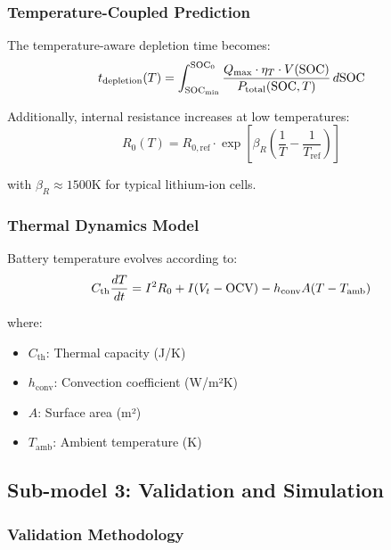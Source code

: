 \subsubsection{Temperature-Coupled Prediction}

The temperature-aware depletion time becomes:
\begin{equation}
t_{\text{depletion}}(T) = \int_{\text{SOC}_{\min}}^{\text{SOC}_0} \frac{Q_{\max} \cdot \eta_T \cdot V(\text{SOC})}{P_{\text{total}}(\text{SOC}, T)} \, d\text{SOC}
\label{eq:temp_coupled_time}
\end{equation}

Additionally, internal resistance increases at low temperatures:
\begin{equation}
R_0(T) = R_{0,\text{ref}} \cdot \exp\left[\beta_R\left(\frac{1}{T} - \frac{1}{T_{\text{ref}}}\right)\right]
\label{eq:resistance_temp}
\end{equation}

with $\beta_R \approx 1500$K for typical lithium-ion cells.

\subsubsection{Thermal Dynamics Model}

Battery temperature evolves according to:
\begin{equation}
C_{\text{th}} \frac{dT}{dt} = I^2 R_0 + I(V_t - \text{OCV}) - h_{\text{conv}}A(T - T_{\text{amb}})
\label{eq:thermal_dynamics}
\end{equation}

where:
\begin{itemize}
    \item $C_{\text{th}}$: Thermal capacity (J/K)
    \item $h_{\text{conv}}$: Convection coefficient (W/m²K)
    \item $A$: Surface area (m²)
    \item $T_{\text{amb}}$: Ambient temperature (K)
\end{itemize}

\subsection{Sub-model 3: Validation and Simulation}

\subsubsection{Validation Methodology}

